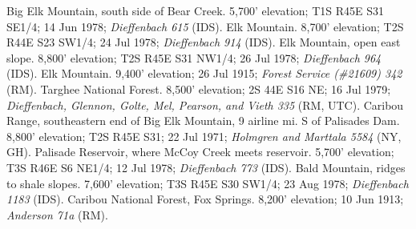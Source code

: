 Big Elk Mountain, south side of Bear Creek. 5,700' elevation;
T1S R45E S31 SE1/4; 14 Jun 1978; \textit{Dieffenbach 615} (IDS).
Elk Mountain. 8,700' elevation; T2S R44E S23 SW1/4; 24 Jul 1978;
\textit{Dieffenbach 914} (IDS).
Elk Mountain, open east slope. 8,800' elevation; T2S R45E S31 NW1/4;
26 Jul 1978; \textit{Dieffenbach 964} (IDS).
Elk Mountain. 9,400' elevation; 26 Jul 1915;
\textit{Forest Service (\#21609) 342} (RM).
Targhee National Forest. 8,500' elevation; 2S 44E S16 NE; 16 Jul 1979;
\textit{Dieffenbach, Glennon, Golte, Mel, Pearson, and Vieth 335} (RM, UTC).
Caribou Range, southeastern end of Big Elk Mountain, 9 airline mi. S of
Palisades Dam. 8,800' elevation; T2S R45E S31; 22 Jul 1971;
\textit{Holmgren and Marttala 5584} (NY, GH).
Palisade Reservoir, where McCoy Creek meets reservoir. 5,700' elevation;
T3S R46E S6 NE1/4; 12 Jul 1978; \textit{Dieffenbach 773} (IDS).
Bald Mountain, ridges to shale slopes. 7,600' elevation; T3S R45E S30 SW1/4;
23 Aug 1978; \textit{Dieffenbach 1183} (IDS).
Caribou National Forest, Fox Springs. 8,200' elevation; 10 Jun 1913;
\textit{Anderson 71a} (RM).


